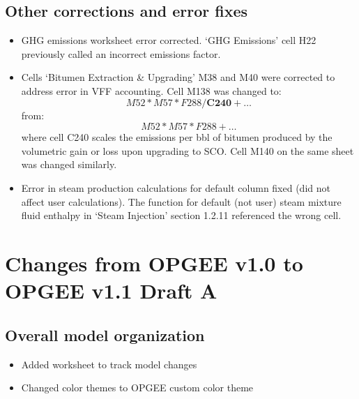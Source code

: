 \documentclass[11pt]{report}
\begin{document}
{{{{\subsection{Other corrections and error fixes} 

\begin{itemize} 
\item GHG emissions worksheet error corrected. `GHG Emissions' cell H22 previously called an incorrect emissions factor. \item Cells `Bitumen Extraction \& Upgrading' M38 and M40 were corrected to address error in VFF accounting. Cell M138 was changed to:
\begin{equation}
M52*M57*F288/\textbf{C240}+\ldots
\end{equation}
from:
\begin{equation}
M52*M57*F288+\ldots
\end{equation}
where cell C240 scales the emissions per bbl of bitumen produced by the volumetric gain or loss upon upgrading to SCO. Cell M140 on the same sheet was changed similarly.
\item Error in steam production calculations for default column fixed (did not affect user calculations). The function for default (not user) steam mixture fluid enthalpy in `Steam Injection' section 1.2.11 referenced the wrong cell. 

\end{itemize} 







\section{Changes from OPGEE v1.0 to OPGEE v1.1 Draft A}


\subsection{Overall model organization}
\begin{itemize}
\item{Added worksheet to track model changes}
\item{Changed color themes to OPGEE custom color theme}
\end{itemize}

}}}}
\end{document}
